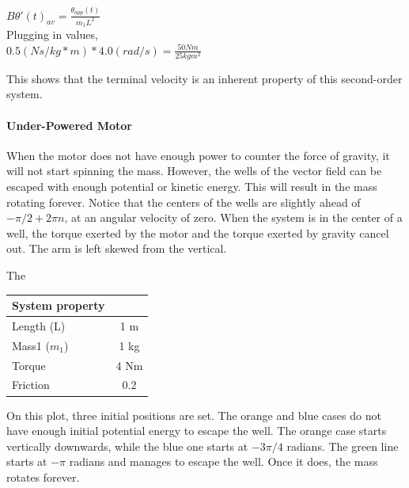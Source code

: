 \documentclass{article}
\begin{document}
\vspace{14pt}
\centering $B\theta'(t)_{av} = \frac{\theta_{app}(t)}{m_1L^2}$ \\
\vspace{14pt}
Plugging in values, \\
\vspace{14pt}
\centering $0.5(Ns/kg*m)*4.0(rad/s) = \frac{50Nm}{25kgm^2}$ \\
\vspace{14pt}

This shows that the terminal velocity is an inherent property of this second-order system. 

\paragraph{Under-Powered Motor} 
When the motor does not have enough power to counter the force of gravity, it will not start spinning the mass. However, the wells of the vector field can be escaped with enough potential or kinetic energy. This will result in the mass rotating forever. Notice that the centers of the wells are slightly ahead of  $-\pi/2 + 2\pi n$, at an angular velocity of zero. When the system is in the center of a well, the torque exerted by the motor and the torque exerted by gravity cancel out. The arm is left skewed from the vertical.

The 

\vspace{14pt}

\centering
\begin{tabular}{|l|c|}
\hline
System property & \\
\hline
Length (L) & 1 m \\
Mass1 ($m_1$) & 1 kg \\
Torque & 4 Nm \\
Friction & 0.2 \\
\hline
\end{tabular}
\label{tab:quantities}

\vspace{14pt}

\centering On this plot, three initial positions are set. The orange and blue cases do not have enough initial potential energy to escape the well. The orange case starts vertically downwards, while the blue one starts at $-3\pi/4$ radians. The green line starts at $-\pi$ radians and manages to escape the well. Once it does, the mass rotates forever. 
\end{document}
